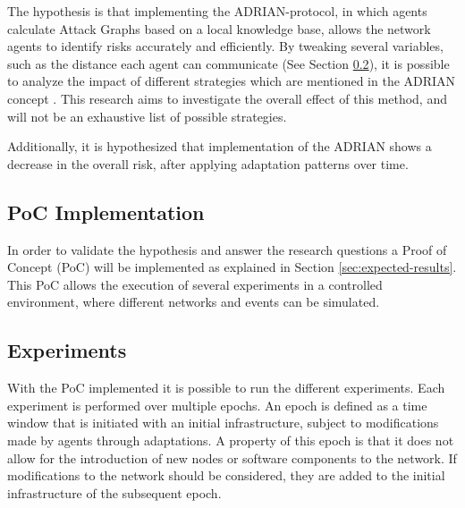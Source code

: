 The hypothesis is that implementing the ADRIAN-protocol, in which agents calculate Attack Graphs based on a local knowledge base, allows the network agents to identify risks accurately and efficiently. By tweaking several variables, such as the distance each agent can communicate (See Section \ref{ssec:experiments}), it is possible to analyze the impact of different strategies which are mentioned in the ADRIAN concept \cite{mann2023ADRIAN}. This research aims to investigate the overall effect of this method, and will not be an exhaustive list of possible strategies. 

Additionally, it is hypothesized that implementation of the ADRIAN shows a decrease in the overall risk, after applying adaptation patterns over time.

\subsection{PoC Implementation} \label{ssec:implementation}
In order to validate the hypothesis and answer the research questions a Proof of Concept (PoC) will be implemented as explained in Section \ref{sec:expected-results}. This PoC allows the execution of several experiments in a controlled environment, where different networks and events can be simulated. 

\subsection{Experiments} \label{ssec:experiments}
With the PoC implemented it is possible to run the different experiments. Each experiment is performed over multiple epochs. An epoch is defined as a time window that is initiated with an initial infrastructure, subject to modifications made by agents through adaptations. A property of this epoch is that it does not allow for the introduction of new nodes or software components to the network. If modifications to the network should be considered, they are added to the initial infrastructure of the subsequent epoch.

